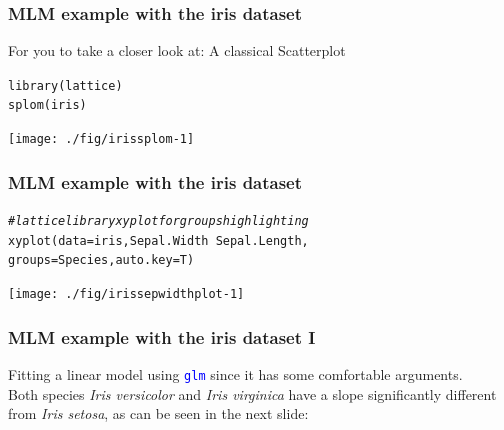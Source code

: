 \documentclass[xcolor=table, xcolor=dvipsnames]{beamer}\usepackage[]{graphicx}\usepackage[]{color}
\makeatletter
\newcommand{\hlcom}[1]{\textcolor[rgb]{0,0.392,0}{\textit{#1}}}
\newcommand{\hlopt}[1]{\textcolor[rgb]{0,0,0}{#1}}
\newcommand{\hlstd}[1]{\textcolor[rgb]{0,0,0}{#1}}
\newcommand{\hlkwc}[1]{\textcolor[rgb]{1,0,1}{#1}}
\newcommand{\hlkwd}[1]{\textcolor[rgb]{0,0,1}{#1}}
\newenvironment{kframe}{%
 \def\at@end@of@kframe{}%
 \ifinner\ifhmode%
  \def\at@end@of@kframe{\end{minipage}}%
  \begin{minipage}{\columnwidth}%
 \fi\fi%
 \def\FrameCommand##1{\hskip\@totalleftmargin \hskip-\fboxsep
 \colorbox{shadecolor}{##1}\hskip-\fboxsep
     \hskip-\linewidth \hskip-\@totalleftmargin \hskip\columnwidth}%
 \MakeFramed {\advance\hsize-\width
   \@totalleftmargin\z@ \linewidth\hsize
   \@setminipage}}%
 {\par\unskip\endMakeFramed%
 \at@end@of@kframe}
\newenvironment{knitrout}{}{} %
\newcommand{\rcode}[1]{\texttt{\textcolor{Blue}{#1}}} %
\makeatother
\begin{document}

\begin{frame}[fragile]\frametitle{MLM example with the iris dataset}
For you to take a closer look at: A classical Scatterplot
\begin{knitrout}
\color{fgcolor}\begin{kframe}
\begin{alltt}
\hlkwd{library}\hlstd{(lattice)}
\hlkwd{splom}\hlstd{(iris)}
\end{alltt}
\end{kframe}

{\centering \texttt{[image: ./fig/irissplom-1]} 

}



\end{knitrout}
\end{frame}





\begin{frame}[fragile]\frametitle{MLM example with the iris dataset}
\begin{knitrout}
\color{fgcolor}\begin{kframe}
\begin{alltt}
\hlcom{# lattice library xyplot for groups highlighting}
\hlkwd{xyplot}\hlstd{(}\hlkwc{data}\hlstd{=iris, Sepal.Width} \hlopt{~} \hlstd{Sepal.Length,}
       \hlkwc{groups}\hlstd{=Species,} \hlkwc{auto.key}\hlstd{=T)}
\end{alltt}
\end{kframe}

{\centering \texttt{[image: ./fig/irissepwidthplot-1]} 

}



\end{knitrout}
\end{frame}


\begin{frame}[fragile]\frametitle{MLM example with the iris dataset I}
Fitting a linear model using \rcode{glm} since it has some comfortable arguments.\\[\baselineskip]
Both species \textit{Iris versicolor} and  \textit{Iris virginica} have a slope significantly different from  \textit{Iris setosa}, as can be seen in the next slide:
\end{frame}
\end{document}
